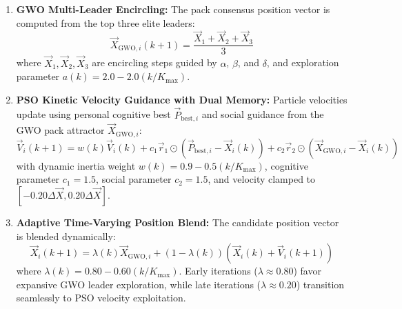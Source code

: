 \documentclass[conference]{IEEEtran}
\begin{document}
\begin{enumerate}
    \item \textbf{GWO Multi-Leader Encircling:} The pack consensus position vector is computed from the top three elite leaders:
    \begin{equation}
    \vec{X}_{\text{GWO}, i}(k+1) = \frac{\vec{X}_1 + \vec{X}_2 + \vec{X}_3}{3}
    \end{equation}
    where $\vec{X}_1, \vec{X}_2, \vec{X}_3$ are encircling steps guided by $\alpha$, $\beta$, and $\delta$, and exploration parameter $a(k) = 2.0 - 2.0(k / K_{\max})$.
    \item \textbf{PSO Kinetic Velocity Guidance with Dual Memory:} Particle velocities update using personal cognitive best $\vec{P}_{\text{best}, i}$ and social guidance from the GWO pack attractor $\vec{X}_{\text{GWO}, i}$:
    \begin{equation}
    \vec{V}_i(k+1) = w(k)\vec{V}_i(k) + c_1 \vec{r}_1 \odot (\vec{P}_{\text{best}, i} - \vec{X}_i(k)) + c_2 \vec{r}_2 \odot (\vec{X}_{\text{GWO}, i} - \vec{X}_i(k))
    \end{equation}
    with dynamic inertia weight $w(k) = 0.9 - 0.5(k / K_{\max})$, cognitive parameter $c_1 = 1.5$, social parameter $c_2 = 1.5$, and velocity clamped to $[-0.20 \Delta \vec{X}, 0.20 \Delta \vec{X}]$.
    \item \textbf{Adaptive Time-Varying Position Blend:} The candidate position vector is blended dynamically:
    \begin{equation}
    \vec{X}_i(k+1) = \lambda(k) \vec{X}_{\text{GWO}, i} + (1 - \lambda(k)) (\vec{X}_i(k) + \vec{V}_i(k+1))
    \end{equation}
    where $\lambda(k) = 0.80 - 0.60(k / K_{\max})$. Early iterations ($\lambda \approx 0.80$) favor expansive GWO leader exploration, while late iterations ($\lambda \approx 0.20$) transition seamlessly to PSO velocity exploitation.
\end{enumerate}
\end{document}
